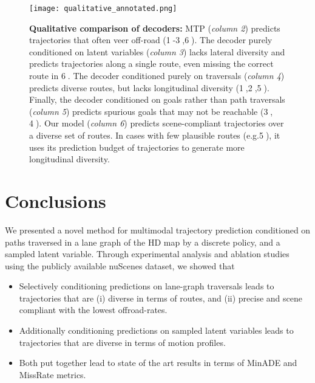 \documentclass{article}
\begin{document}
\begin{figure*}[t]
\centering
\texttt{[image: qualitative\_annotated.png]}
\caption{\textbf{Qualitative comparison of decoders:}
MTP (\textit{column 2}) predicts trajectories that often veer off-road (\textcircled{1}-\textcircled{3},\textcircled{6}). The decoder purely conditioned on latent variables (\textit{column 3}) lacks lateral diversity and predicts trajectories along a single route, even missing the correct route in \textcircled{6}. The decoder conditioned purely on traversals (\textit{column 4}) predicts diverse routes, but lacks longitudinal diversity (\textcircled{1},\textcircled{2},\textcircled{5}). Finally, the decoder conditioned on goals rather than path traversals (\textit{column 5}) predicts spurious goals that may not be reachable (\textcircled{3}, \textcircled{4}). Our model (\textit{column 6}) predicts scene-compliant trajectories over a diverse set of routes. In cases with few plausible routes (e.g.\textcircled{5}), it uses its prediction budget of  trajectories to generate more longitudinal diversity.}
\label{fig_qual}
\end{figure*}




\vspace{-2mm}
\section{Conclusions}
\label{sec:conclusion}


We presented a novel method for multimodal trajectory prediction conditioned on paths traversed in a lane graph of the HD map by a discrete policy, and a sampled latent variable. Through experimental analysis and ablation studies using the publicly available nuScenes dataset, we showed that 
\begin{itemize}[noitemsep,topsep=0pt,leftmargin=10pt]
\item Selectively conditioning predictions on lane-graph traversals leads to trajectories that are (i) diverse in terms of routes, and (ii) precise and scene compliant with the lowest offroad-rates.
\item Additionally conditioning predictions on sampled latent variables leads to trajectories that are diverse in terms of motion profiles.
\item Both put together lead to state of the art results in terms of MinADE and MissRate metrics.
\end{itemize}
\end{document}
